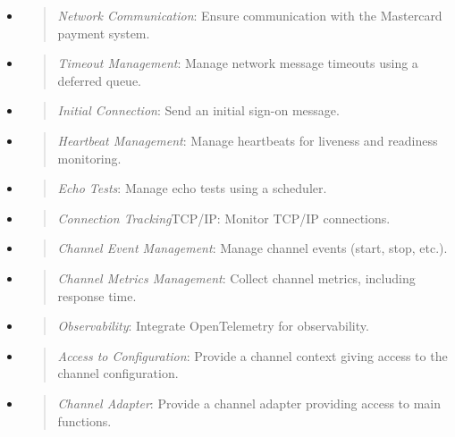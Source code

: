 \documentclass[12pt,a4paper]{report}
\begin{document}
\begin{itemize}
\item
  \begin{quote}
  \emph{Network Communication}: Ensure communication with the Mastercard
  payment system.
  \end{quote}
\item
  \begin{quote}
  \emph{Timeout Management}: Manage network message timeouts using a
  deferred queue.
  \end{quote}
\item
  \begin{quote}
  \emph{Initial Connection}: Send an initial sign-on message.
  \end{quote}
\item
  \begin{quote}
  \emph{Heartbeat Management}: Manage heartbeats for liveness and
  readiness monitoring.
  \end{quote}
\item
  \begin{quote}
  \emph{Echo Tests}: Manage echo tests using a scheduler.
  \end{quote}
\item
  \begin{quote}
  \emph{Connection Tracking}TCP/IP: Monitor TCP/IP connections.
  \end{quote}
\item
  \begin{quote}
  \emph{Channel Event Management}: Manage channel events (start, stop,
  etc.).
  \end{quote}
\item
  \begin{quote}
  \emph{Channel Metrics Management}: Collect channel metrics, including
  response time.
  \end{quote}
\item
  \begin{quote}
  \emph{Observability}: Integrate OpenTelemetry for observability.
  \end{quote}
\item
  \begin{quote}
  \emph{Access to Configuration}: Provide a channel context giving
  access to the channel configuration.
  \end{quote}
\item
  \begin{quote}
  \emph{Channel Adapter}: Provide a channel adapter providing access to
  main functions.

\end{quote}
\end{itemize}
\end{document}
